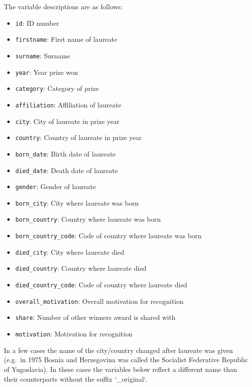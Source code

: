 \documentclass[
]{article}
\providecommand{\tightlist}{%
  \setlength{\itemsep}{0pt}\setlength{\parskip}{0pt}}
\begin{document}
The variable descriptions are as follows:

\begin{itemize}
\tightlist
\item
  \texttt{id}: ID number
\item
  \texttt{firstname}: First name of laureate
\item
  \texttt{surname}: Surname
\item
  \texttt{year}: Year prize won
\item
  \texttt{category}: Category of prize
\item
  \texttt{affiliation}: Affiliation of laureate
\item
  \texttt{city}: City of laureate in prize year
\item
  \texttt{country}: Country of laureate in prize year
\item
  \texttt{born\_date}: Birth date of laureate
\item
  \texttt{died\_date}: Death date of laureate
\item
  \texttt{gender}: Gender of laureate
\item
  \texttt{born\_city}: City where laureate was born
\item
  \texttt{born\_country}: Country where laureate was born
\item
  \texttt{born\_country\_code}: Code of country where laureate was born
\item
  \texttt{died\_city}: City where laureate died
\item
  \texttt{died\_country}: Country where laureate died
\item
  \texttt{died\_country\_code}: Code of country where laureate died
\item
  \texttt{overall\_motivation}: Overall motivation for recognition
\item
  \texttt{share}: Number of other winners award is shared with
\item
  \texttt{motivation}: Motivation for recognition
\end{itemize}

In a few cases the name of the city/country changed after laureate was
given (e.g.~in 1975 Bosnia and Herzegovina was called the Socialist
Federative Republic of Yugoslavia). In these cases the variables below
reflect a different name than their counterparts without the suffix
`\_original`.
\end{document}

